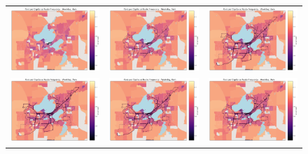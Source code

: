 \documentclass[letter]{article}
\begin{document}
\begin{figure}
\begin{center}
\begin{tabular}{ c c c }
    \includegraphics[width=60mm]{CarOwnershipVSfrequency4am.png}   & \includegraphics[width=60mm]{CarOwnershipVSfrequency5am.png}  & \includegraphics[width=60mm]{CarOwnershipVSfrequency6am.png}  \\
    
      \includegraphics[width=60mm]{CarOwnershipVSfrequency7am.png}   & \includegraphics[width=60mm]{CarOwnershipVSfrequency8am.png}  & \includegraphics[width=60mm]{CarOwnershipVSfrequency9am.png}  \\
      

\end{tabular}
\end{center}
\end{figure}
\end{document}
